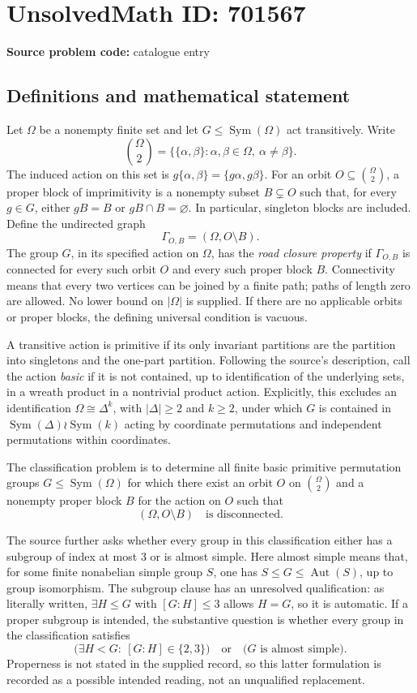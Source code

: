 \documentclass[11pt]{article}
\begin{document}
\section*{UnsolvedMath ID: 701567}
\textbf{Source problem code:} catalogue entry
\subsection{Definitions and mathematical statement}
Let \(\Omega\) be a nonempty finite set and let \(G\leq\operatorname{Sym}(\Omega)\) act transitively. Write
\[
\binom{\Omega}{2}=\{\{\alpha,\beta\}:\alpha,\beta\in\Omega,\ \alpha\ne\beta\}.
\]
The induced action on this set is \(g\{\alpha,\beta\}=\{g\alpha,g\beta\}\). For an orbit \(O\subseteq\binom{\Omega}{2}\), a proper block of imprimitivity is a nonempty subset \(B\subsetneq O\) such that, for every \(g\in G\), either \(gB=B\) or \(gB\cap B=\varnothing\). In particular, singleton blocks are included. Define the undirected graph
\[
\Gamma_{O,B}=(\Omega,O\setminus B).
\]
The group \(G\), in its specified action on \(\Omega\), has the \emph{road closure property} if \(\Gamma_{O,B}\) is connected for every such orbit \(O\) and every such proper block \(B\). Connectivity means that every two vertices can be joined by a finite path; paths of length zero are allowed. No lower bound on \(|\Omega|\) is supplied. If there are no applicable orbits or proper blocks, the defining universal condition is vacuous.

A transitive action is primitive if its only invariant partitions are the partition into singletons and the one-part partition. Following the source's description, call the action \emph{basic} if it is not contained, up to identification of the underlying sets, in a wreath product in a nontrivial product action. Explicitly, this excludes an identification \(\Omega\cong\Delta^k\), with \(|\Delta|\geq2\) and \(k\geq2\), under which \(G\) is contained in \(\operatorname{Sym}(\Delta)\wr\operatorname{Sym}(k)\) acting by coordinate permutations and independent permutations within coordinates.

The classification problem is to determine all finite basic primitive permutation groups \(G\leq\operatorname{Sym}(\Omega)\) for which there exist an orbit \(O\) on \(\binom{\Omega}{2}\) and a nonempty proper block \(B\) for the action on \(O\) such that
\[
(\Omega,O\setminus B)\quad\text{is disconnected}.
\]

The source further asks whether every group in this classification either has a subgroup of index at most \(3\) or is almost simple. Here almost simple means that, for some finite nonabelian simple group \(S\), one has \(S\leq G\leq\operatorname{Aut}(S)\), up to group isomorphism. The subgroup clause has an unresolved qualification: as literally written, \(\exists H\leq G\) with \([G:H]\leq3\) allows \(H=G\), so it is automatic. If a proper subgroup is intended, the substantive question is whether every group in the classification satisfies
\[
\bigl(\exists H<G:\ [G:H]\in\{2,3\}\bigr)
\quad\text{or}\quad
\bigl(G\text{ is almost simple}\bigr).
\]
Properness is not stated in the supplied record, so this latter formulation is recorded as a possible intended reading, not an unqualified replacement.
\end{document}
